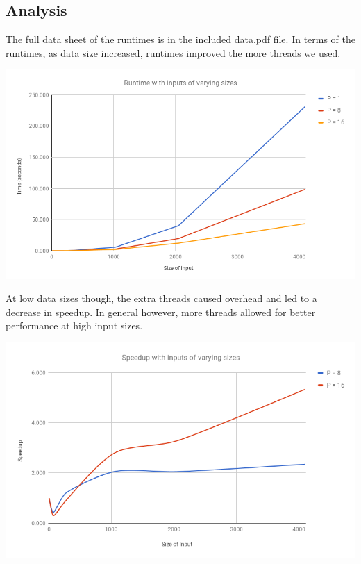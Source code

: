 \documentclass{math}
\begin{document}
\subsection*{Analysis}
The full data sheet of the runtimes is in the included data.pdf file.
In terms of the runtimes, as data size increased, runtimes improved the more
threads we used.
\begin{center}
  \includegraphics[width=16cm]{assets/project1_runtime.png}
\end{center}
At low data sizes though, the extra threads caused overhead and led to a
decrease in speedup. In general however, more threads allowed for better
performance at high input sizes.
\begin{center}
  \includegraphics[width=16cm]{assets/project1_speedup.png}
\end{center}
\end{document}
